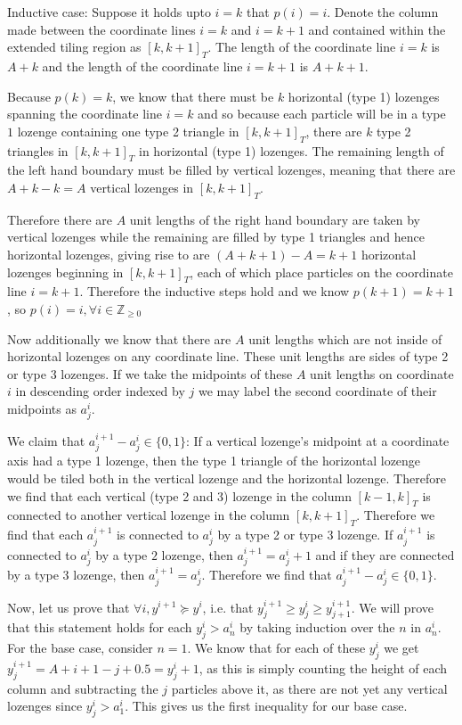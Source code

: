 \documentclass[12pt]{article}
\begin{document}
	Inductive case: Suppose it holds upto $i=k$ that $p(i)=i$. 
	Denote the column made between the coordinate lines $i=k$ and $i=k+1$ and contained within the extended tiling region as $[k,k+1]_T$. 
	The length of the coordinate line $i=k$ is $A+k$ and the length of the coordinate line $i=k+1$ is $A+k+1$. 
	
	Because $p(k)=k$,  we know that there must be $k$ horizontal (type 1) lozenges spanning the coordinate line $i=k$ and so because each particle will be in a type $1$ lozenge containing one type 2 triangle in $[k,k+1]_T$, there are $k$ type 2 triangles in $[k,k+1]_T$ in horizontal (type 1) lozenges. The remaining length of the left hand boundary must be filled by vertical lozenges, meaning that there are $A+k-k=A$ vertical lozenges in $[k,k+1]_T$. 
	
	Therefore there are $A$ unit lengths of the right hand boundary are taken by vertical lozenges while the remaining are filled by type 1 triangles and hence horizontal lozenges, giving rise to are $(A+k+1)-A=k+1$ horizontal lozenges beginning in $[k,k+1]_T$, each of which place particles on the coordinate line $i=k+1$. 
	Therefore the inductive steps hold and we know $p(k+1)=k+1$, so $p(i)=i, \forall i\in \mathbb{Z}_{\geq 0}$
	
	Now additionally we know that there are $A$ unit lengths which are not inside of horizontal lozenges on any coordinate line. 
	These unit lengths are sides of type 2 or type 3 lozenges. 
	If we take the midpoints of these $A$ unit lengths on coordinate $i$ in descending order indexed by $j$ we may label the second coordinate of their midpoints as $a_j^i$.  
	
	We claim that $a_j^{i+1}-a_j^i\in \{0,1\}$: If a vertical lozenge's midpoint at a coordinate axis had a type 1 lozenge, then the type 1 triangle of the horizontal lozenge would be tiled both in the vertical lozenge and the horizontal lozenge.
	Therefore we find that each vertical (type 2 and 3) lozenge in the column $[k-1,k]_T$ is connected  to another vertical lozenge in the column $[k,k+1]_T$. Therefore we find that each $a_j^{i+1}$ is connected to $a_j^{i}$ by a type 2 or type 3 lozenge.
	If $a_{j}^{i+1}$ is connected to $a_j^i$ by a type $2$ lozenge, then $a_{j}^{i+1}=a_j^i+1$ and if they are connected by a type 3 lozenge, then $a_j^{i+1}=a_j^i$.
	Therefore we find that $a_j^{i+1}-a_j^i\in \{0,1\}$.
	
	Now, let us prove that $\forall i, y^{i+1}\succeq y^i$, i.e. that $y_{j}^{i+1}\geq y_{j}^i\geq y_{j+1}^{i+1}$.
	We will prove that this statement holds for each $y_j^i>a_n^i$ by taking induction over the $n$ in $a_n^i$.
	For the base case, consider $n=1$. We know that for each of these $y_j^i$ we get $y_j^{i+1}=A+i+1-j+0.5=y_j^i+1$, as this is simply counting the height of each column and subtracting the $j$ particles above it, as there are not yet any vertical lozenges since $y_j^i>a_1^i$.
	This gives us the first inequality for our base case. 
	
\end{document}
